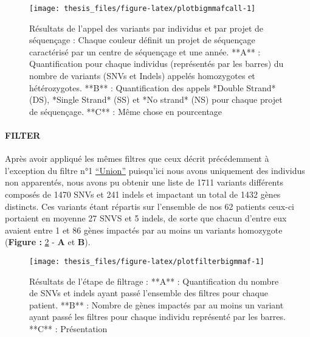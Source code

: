 \documentclass[12pt,twoside]{reedthesis}
\theoremstyle{definition}
\theoremstyle{definition}
\theoremstyle{remark}
\begin{document}
  \begin{figure}
  
  {\centering \texttt{[image: thesis\_files/figure-latex/plotbigmmafcall-1]} 
  
  }
  
  \caption[Résultats de l'appel des variants par individus et par projet de séquençage]{Résultats de l'appel des variants par individus et par projet de séquençage : Chaque couleur définit un projet de séquençage caractérisé par un centre de séquençage et une année. **A** : Quantification pour chaque individus (représentés par les barres) du nombre de variants (SNVs et Indels) appelés homozygotes et hétérozygotes. **B** : Quantification des appels *Double Strand* (DS), *Single Strand* (SS) et *No strand* (NS) pour chaque projet de séquençage. **C** : Même chose en pourcentage}\label{fig:plotbigmmafcall}
  \end{figure}
  
  \newpage
  
  \paragraph{FILTER}\label{filter-1}
  
  Après avoir appliqué les mêmes filtres que ceux décrit précédemment à
  l'exception du filtre n°1
  \protect\hyperlink{filterdescription}{``Union''} puisqu'ici nous avons
  uniquement des individus non apparentés, nous avons pu obtenir une liste
  de 1711 variants différents composés de 1470 SNVs et 241 indels et
  impactant un total de 1432 gènes distincts. Ces variants étant répartis
  sur l'ensemble de nos 62 patients ceux-ci portaient en moyenne 27 SNVS
  et 5 indels, de sorte que chacun d'entre eux avaient entre 1 et 86 gènes
  impactés par au moins un variants homozygote (\textbf{Figure :
  }\ref{fig:plotfilterbigmmaf} - \textbf{A} et \textbf{B}).
  
  \begin{figure}
  
  {\centering \texttt{[image: thesis\_files/figure-latex/plotfilterbigmmaf-1]} 
  
  }
  
  \caption[Résultats de l'étape de filtrage]{Résultats de l'étape de filtrage : **A** : Quantification du nombre de SNVs et indels ayant passé l'ensemble des filtres pour chaque patient. **B** : Nombre de gènes impactés par au moins un variant ayant passé les filtres pour chaque individu représenté par les barres. **C** : Présentation }\label{fig:plotfilterbigmmaf}
  \end{figure}
  
\end{document}
